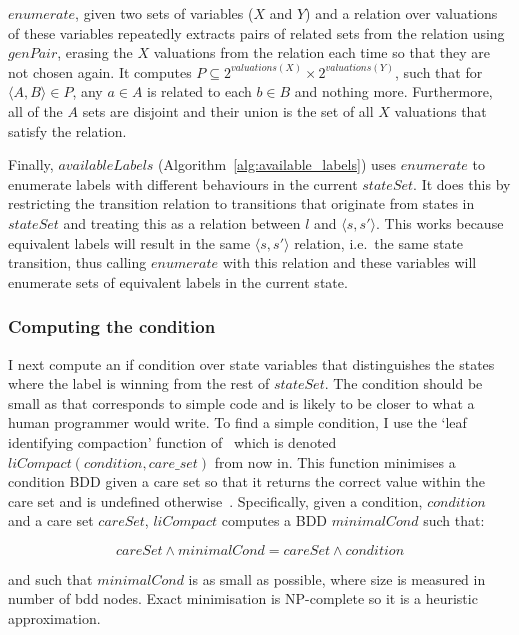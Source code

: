 $enumerate$, given two sets of variables ($X$ and $Y$) and a relation over valuations of these variables repeatedly extracts pairs of related sets from the relation using $genPair$, erasing the $X$ valuations from the relation each time so that they are not chosen again. It computes $P \subseteq 2^{valuations(X)} \times 2^{valuations(Y)}$, such that for $\langle A, B \rangle \in P$, any $a \in A$ is related to each $b \in B$ and nothing more. Furthermore, all of the $A$ sets are disjoint and their union is the set of all $X$ valuations that satisfy the relation.

Finally, $availableLabels$ (Algorithm~\ref{alg:available_labels}) uses $enumerate$ to enumerate labels with different behaviours in the current $stateSet$. It does this by restricting the transition relation to transitions that originate from states in $stateSet$ and treating this as a relation between $l$ and $\langle s, s' \rangle$. This works because equivalent labels will result in the same $\langle s, s' \rangle$ relation, i.e.\ the same state transition, thus calling $enumerate$ with this relation and these variables will enumerate sets of equivalent labels in the current state.

\subsubsection{Computing the condition}

I next compute an if condition over state variables that distinguishes the states where the label is winning from the rest of $stateSet$. The condition should be small as that corresponds to simple code and is likely to be closer to what a human programmer would write. To find a simple condition, I use the `leaf identifying compaction' function of~\cite{Hong} which is denoted $liCompact(condition, care\_set)$ from now in. This function minimises a condition BDD given a care set so that it returns the correct value within the care set and is undefined otherwise~\cite{Hong}. Specifically, given a condition, $condition$ and a care set $careSet$, $liCompact$ computes a BDD $minimalCond$ such that:

\begin{equation}
    careSet \land minimalCond = careSet \land condition
\end{equation}

\noindent and such that $minimalCond$ is as small as possible, where size is measured in number of bdd nodes. Exact minimisation is NP-complete so it is a heuristic approximation.

